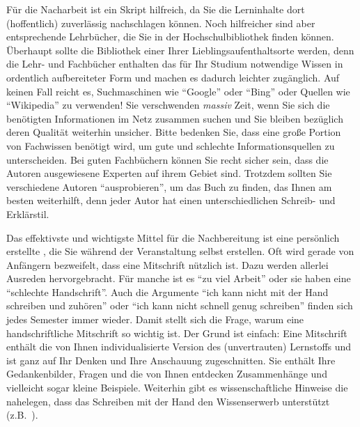 Für die Nacharbeit ist ein Skript hilfreich, da Sie die Lerninhalte dort (hoffentlich) zuverlässig 
nachschlagen können. Noch hilfreicher sind aber entsprechende Lehrbücher, die Sie in der 
Hochschulbibliothek finden können. Überhaupt sollte die Bibliothek einer Ihrer 
Lieblingsaufenthaltsorte werden, denn die Lehr- und Fachbücher enthalten das für Ihr Studium 
notwendige Wissen in ordentlich aufbereiteter Form und machen es dadurch leichter zugänglich. Auf 
keinen Fall reicht es,  Suchmaschinen wie "`Google"' oder "`Bing"' oder 
Quellen wie "`Wikipedia"' zu verwenden! Sie  verschwenden \emph{massiv} Zeit, 
wenn Sie sich die benötigten Informationen im Netz zusammen  suchen und Sie bleiben bezüglich 
deren Qualität weiterhin unsicher. Bitte bedenken Sie, dass eine große Portion von Fachwissen benötigt 
wird, um gute und schlechte Informationsquellen zu unterscheiden. Bei guten Fachbüchern können Sie 
recht sicher sein, dass die Autoren ausgewiesene Experten auf ihrem Gebiet sind. Trotzdem sollten Sie 
verschiedene Autoren "`ausprobieren"', um das Buch zu finden, das Ihnen am besten weiterhilft, denn 
jeder Autor hat einen unterschiedlichen Schreib- und Erklärstil. 

Das effektivste und wichtigste Mittel für die Nachbereitung ist eine persönlich erstellte , die Sie während der Veranstaltung selbst erstellen. Oft wird gerade von Anfängern bezweifelt, dass eine  Mitschrift nützlich ist. Dazu werden allerlei Ausreden hervorgebracht. Für manche ist es "`zu viel  Arbeit"' oder sie haben eine "`schlechte Handschrift"'. Auch die Argumente "`ich kann nicht  mit der Hand schreiben und zuhören"' oder "`ich kann nicht schnell genug schreiben"' finden sich  jedes Semester immer wieder. Damit stellt sich die Frage, warum eine handschriftliche  Mitschrift so  wichtig ist. Der Grund ist einfach: Eine Mitschrift enthält die von Ihnen individualisierte Version des  (unvertrauten) Lernstoffs und ist  ganz auf Ihr Denken und Ihre Anschauung zugeschnitten. Sie enthält Ihre Gedankenbilder, Fragen und die von Ihnen entdecken Zusammenhänge und vielleicht sogar kleine Beispiele. Weiterhin gibt es wissenschaftliche Hinweise die nahelegen, dass das Schreiben mit der Hand den Wissenserwerb unterstützt (z.B.~\cite{MuBe14}). 

